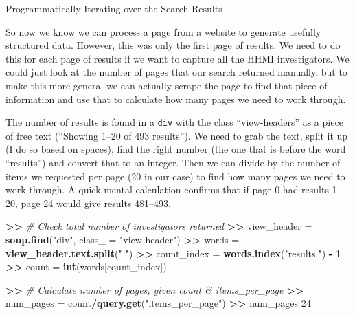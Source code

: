 \documentclass[]{krantz}
\newenvironment{Shaded}{\begin{snugshade}}{\end{snugshade}}
\newcommand{\KeywordTok}[1]{\textcolor[rgb]{0.13,0.29,0.53}{\textbf{#1}}}
\newcommand{\DataTypeTok}[1]{\textcolor[rgb]{0.13,0.29,0.53}{#1}}
\newcommand{\DecValTok}[1]{\textcolor[rgb]{0.00,0.00,0.81}{#1}}
\newcommand{\StringTok}[1]{\textcolor[rgb]{0.31,0.60,0.02}{#1}}
\newcommand{\CommentTok}[1]{\textcolor[rgb]{0.56,0.35,0.01}{\textit{#1}}}
\newcommand{\OperatorTok}[1]{\textcolor[rgb]{0.81,0.36,0.00}{\textbf{#1}}}
\newcommand{\ErrorTok}[1]{\textcolor[rgb]{0.64,0.00,0.00}{\textbf{#1}}}
\newcommand{\NormalTok}[1]{#1}
\begin{document}
Programmatically Iterating over the Search Results

So now we know we can process a page from a website to generate usefully
structured data. However, this was only the first page of results. We
need to do this for each page of results if we want to capture all the
HHMI investigators. We could just look at the number of pages that our
search returned manually, but to make this more general we can actually
scrape the page to find that piece of information and use that to
calculate how many pages we need to work through.

The number of results is found in a \texttt{div} with the class
``view-headers'' as a piece of free text (``Showing 1--20 of 493
results''). We need to grab the text, split it up (I do so based on
spaces), find the right number (the one that is before the word
``results'') and convert that to an integer. Then we can divide by the
number of items we requested per page (20 in our case) to find how many
pages we need to work through. A quick mental calculation confirms that
if page 0 had results 1--20, page 24 would give results 481--493.

\begin{Shaded}
\begin{Highlighting}[]
\OperatorTok{>}\ErrorTok{>}\StringTok{ }\CommentTok{# Check total number of investigators returned}
\ErrorTok{>>}\StringTok{ }\NormalTok{view_header =}\StringTok{ }\KeywordTok{soup.find}\NormalTok{(}\StringTok{"div"}\NormalTok{, }\DataTypeTok{class_ =} \StringTok{"view-header"}\NormalTok{)}
\OperatorTok{>}\ErrorTok{>}\StringTok{ }\NormalTok{words =}\StringTok{ }\KeywordTok{view_header.text.split}\NormalTok{(}\StringTok{" "}\NormalTok{)}
\OperatorTok{>}\ErrorTok{>}\StringTok{ }\NormalTok{count_index =}\StringTok{ }\KeywordTok{words.index}\NormalTok{(}\StringTok{"results."}\NormalTok{) }\OperatorTok{-}\StringTok{ }\DecValTok{1}
\OperatorTok{>}\ErrorTok{>}\StringTok{ }\NormalTok{count =}\StringTok{ }\KeywordTok{int}\NormalTok{(words[count_index])}

\OperatorTok{>}\ErrorTok{>}\StringTok{ }\CommentTok{# Calculate number of pages, given count & items_per_page}
\ErrorTok{>>}\StringTok{ }\NormalTok{num_pages =}\StringTok{ }\NormalTok{count}\OperatorTok{/}\KeywordTok{query.get}\NormalTok{(}\StringTok{"items_per_page"}\NormalTok{)}
\OperatorTok{>}\ErrorTok{>}\StringTok{ }\NormalTok{num_pages}
\DecValTok{24}
\end{Highlighting}
\end{Shaded}
\end{document}

